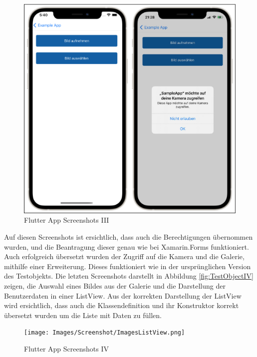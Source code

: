  \newpage 
\begin{figure}[!ht]
 \includegraphics[width=\textwidth,keepaspectratio]{Images/Screenshot/Permissions.png}
 \caption{Flutter App Screenshots III}
 \label{fig:FlutterAppIII}
\end{figure}
Auf diesen Screenshots ist ersichtlich,  dass auch die Berechtigungen übernommen wurden,  und die Beantragung dieser genau wie bei Xamarin.Forms funktioniert.  Auch erfolgreich übersetzt wurden der Zugriff auf die Kamera und die Galerie,  mithilfe einer Erweiterung.  Dieses funktioniert wie in der ursprünglichen Version des Testobjekts.  Die letzten Screenshots darstellt in Abbildung \ref{fig:TestObjectIV} zeigen,  die Auswahl eines Bildes aus der Galerie und die Darstellung der Benutzerdaten in einer ListView.  Aus der korrekten Darstellung der ListView wird ersichtlich,  dass auch die Klassendefinition und ihr Konstruktor korrekt übersetzt wurden um die Liste mit Daten zu füllen. 
 
 \newpage 
\begin{figure}[!ht]
 \texttt{[image: Images/Screenshot/ImagesListView.png]}
 \caption{Flutter App Screenshots IV}
 \label{fig:FlutterAppIV}
\end{figure}

